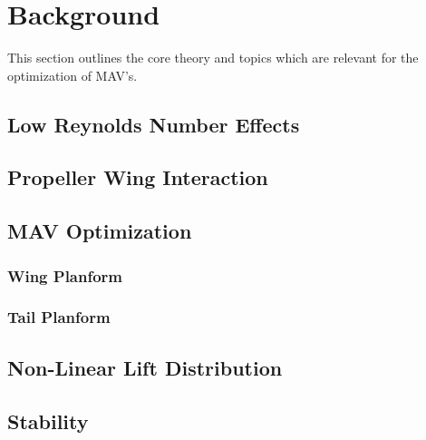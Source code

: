 \graphicspath{{./Figs/}}

\chapter{Background} 
This section outlines the core theory and topics which are relevant for the optimization of MAV's.


\section{Low Reynolds Number Effects }
\label{sec:LowReynolds}

\section{Propeller Wing Interaction}
\label{sec:Propeller Wing Interaction}

\section{MAV Optimization}
\label{sec:MAV Optimization}
\subsection{Wing Planform}

\subsection{Tail Planform}

\section{Non-Linear Lift Distribution}
\label{sec:Non-Linear Lift Distribution}

\section{Stability}


